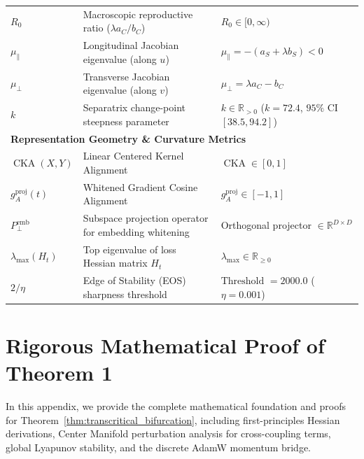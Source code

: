 \documentclass{article}
\theoremstyle{plain}
\theoremstyle{definition}
\DeclareMathOperator{\CKA}{CKA}
\begin{document}
\begin{table}[h]
\begin{small}
\begin{tabular}{lll}
$R_0$ & Macroscopic reproductive ratio ($\lambda a_C / b_C$) & $R_0 \in [0, \infty)$ \\
$\mu_{\parallel}$ & Longitudinal Jacobian eigenvalue (along $u$) & $\mu_{\parallel} = -(a_S + \lambda b_S) < 0$ \\
$\mu_{\perp}$ & Transverse Jacobian eigenvalue (along $v$) & $\mu_{\perp} = \lambda a_C - b_C$ \\
$k$ & Separatrix change-point steepness parameter & $k \in \mathbb{R}_{> 0}$ ($k = 72.4$, $95\%$ CI $[38.5, 94.2]$) \\
\multicolumn{3}{l}{\textbf{Representation Geometry \& Curvature Metrics}} \\
$\CKA(X, Y)$ & Linear Centered Kernel Alignment & $\CKA \in [0, 1]$ \\
$g_A^{\text{proj}}(t)$ & Whitened Gradient Cosine Alignment & $g_A^{\text{proj}} \in [-1, 1]$ \\
$P_{\perp}^{\text{emb}}$ & Subspace projection operator for embedding whitening & Orthogonal projector $\in \mathbb{R}^{D \times D}$ \\
$\lambda_{\text{max}}(H_t)$ & Top eigenvalue of loss Hessian matrix $H_t$ & $\lambda_{\text{max}} \in \mathbb{R}_{\ge 0}$ \\
$2/\eta$ & Edge of Stability (EOS) sharpness threshold & $\text{Threshold } = 2000.0$ ($\eta = 0.001$) \\
\bottomrule
\end{tabular}
\end{small}
\end{table}

\section{Rigorous Mathematical Proof of Theorem 1}
\label{sec:appendix_proof}

In this appendix, we provide the complete mathematical foundation and proofs for Theorem~\ref{thm:transcritical_bifurcation}, including first-principles Hessian derivations, Center Manifold perturbation analysis for cross-coupling terms, global Lyapunov stability, and the discrete AdamW momentum bridge.
\end{document}
